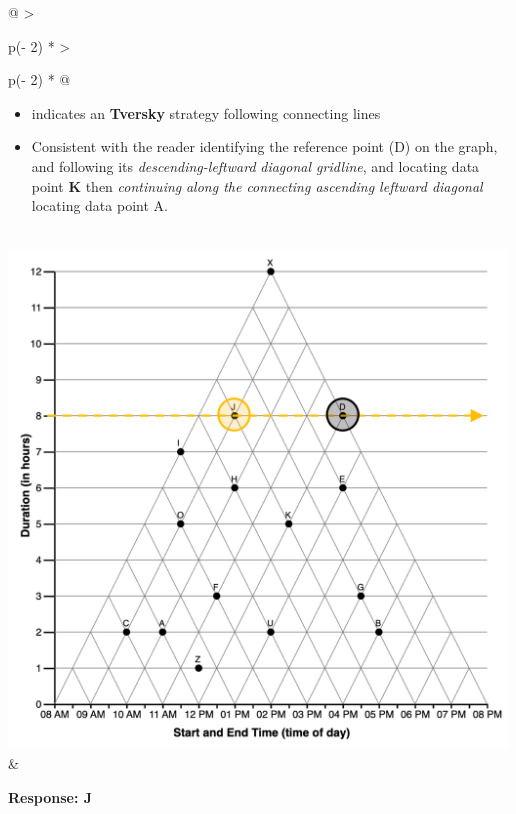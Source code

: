 \documentclass[
  letterpaper,
  DIV=11,
  numbers=noendperiod]{scrreprt}
\providecommand{\tightlist}{%
  \setlength{\itemsep}{0pt}\setlength{\parskip}{0pt}}\usepackage{longtable,booktabs,array}
\begin{document}
\begin{longtable}[]{@{}
  >{\raggedright\arraybackslash}p{(\columnwidth - 2\tabcolsep) * }
  >{\raggedright\arraybackslash}p{(\columnwidth - 2\tabcolsep) * }@{}}
\begin{minipage}[t]{\linewidth}
\begin{itemize}
\tightlist
\item
  indicates an \textbf{Tversky} strategy following connecting lines
\item
  Consistent with the reader identifying the reference point (D) on the
  graph, and following its \emph{descending-leftward} \emph{diagonal
  gridline}, and locating data point \textbf{K} then \emph{continuing}
  \emph{along the connecting ascending leftward diagonal} locating data
  point A.
\end{itemize}
\end{minipage} \\
\includegraphics[width=5.20833in,height=\textheight]{analysis/SGC3A/static/interpretations/Q2_111_J.png}
& \begin{minipage}[t]{\linewidth}\raggedright
\textbf{Response: J}


\end{minipage}
\end{longtable}
\end{document}
